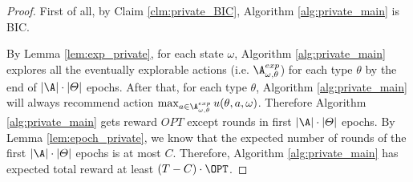 \begin{proof}
First of all, by Claim \ref{clm:private_BIC}, Algorithm \ref{alg:private_main} is BIC. 

By Lemma \ref{lem:exp_private}, for each state $\omega$, Algorithm \ref{alg:private_main} explores all the eventually explorable actions (i.e. $\A_{\omega,\theta}^{exp}$) for each type $\theta$ by the end of $|\A|\cdot |\varTheta|$ epochs. After that, for each type $\theta$, Algorithm \ref{alg:private_main} will always recommend action $ \max_{a \in \A_{\omega,\theta}^{exp}} u(\theta, a, \omega)$. Therefore Algorithm \ref{alg:private_main} gets reward $OPT$ except rounds in first $|\A|\cdot |\varTheta|$ epochs. By Lemma \ref{lem:epoch_private}, we know that the expected number of rounds of the first  $|\A|\cdot |\varTheta|$ epochs is at most $C$. Therefore, Algorithm \ref{alg:private_main} has expected total reward at least  $\left(T - C \right) \cdot \OPT$.

\end{proof}